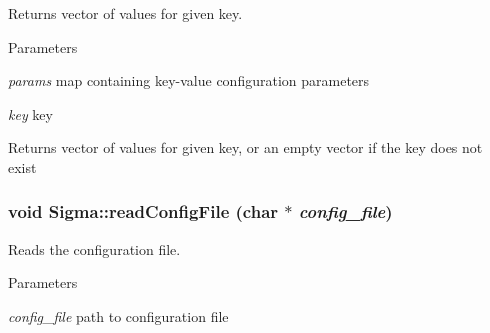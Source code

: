 Returns vector of values for given key. 
\begin{DoxyParams}{Parameters}
\item[{\em params}]map containing key-\/value configuration parameters \item[{\em key}]key \end{DoxyParams}
\begin{DoxyReturn}{Returns}
vector of values for given key, or an empty vector if the key does not exist 
\end{DoxyReturn}
\hypertarget{classSigma_aebecf315bb7a8fd9c55672b5d81c6385}{
\subsubsection[{readConfigFile}]{\setlength{\rightskip}{0pt plus 5cm}void Sigma::readConfigFile (char $\ast$ {\em config\_\-file})}}
\label{classSigma_aebecf315bb7a8fd9c55672b5d81c6385}


Reads the configuration file. 
\begin{DoxyParams}{Parameters}
\item[{\em config\_\-file}]path to configuration file \end{DoxyParams}


